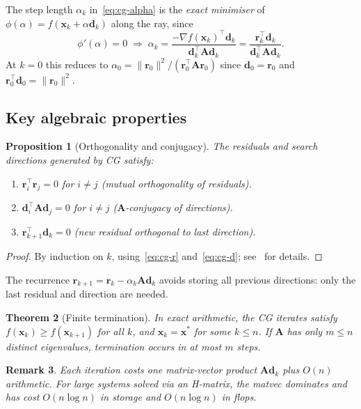 \documentclass[11pt,a4paper]{article}
\newtheorem{theorem}{Theorem}[section]
\newtheorem{proposition}[theorem]{Proposition}
\newtheorem{remark}[theorem]{Remark}
\newcommand{\bA}{\mathbf{A}}
\newcommand{\br}{\mathbf{r}}
\newcommand{\bd}{\mathbf{d}}
\newcommand{\bx}{\mathbf{x}}
\newcommand{\norm}[1]{\|#1\|}
\newcommand{\tr}{\top}
\begin{document}
The step length $\alpha_k$ in~\eqref{eq:cg-alpha} is the \emph{exact minimiser}
of $\phi(\alpha) = f(\bx_k + \alpha\bd_k)$ along the ray, since
\[
  \phi'(\alpha) = 0 \;\Longrightarrow\; \alpha_k
  = \frac{-\nabla f(\bx_k)^\tr \bd_k}{\bd_k^\tr \bA \bd_k}
  = \frac{\br_k^\tr \bd_k}{\bd_k^\tr \bA \bd_k}.
\]
At $k=0$ this reduces to $\alpha_0 = \norm{\br_0}^2 / (\br_0^\tr \bA \br_0)$
since $\bd_0 = \br_0$ and $\br_0^\tr\bd_0 = \norm{\br_0}^2$.

\subsection{Key algebraic properties}

\begin{proposition}[Orthogonality and conjugacy]
  \label{prop:orthogonality}
  The residuals and search directions generated by CG satisfy:
  \begin{enumerate}
    \item $\br_i^\tr \br_j = 0$ for $i \neq j$ (mutual orthogonality of residuals).
    \item $\bd_i^\tr \bA \bd_j = 0$ for $i \neq j$ ($\bA$-conjugacy of directions).
    \item $\br_{k+1}^\tr \bd_k = 0$ (new residual orthogonal to last direction).
  \end{enumerate}
\end{proposition}

\begin{proof}
  By induction on $k$, using~\eqref{eq:cg-r} and~\eqref{eq:cg-d}; see~\cite{NocWri2006} for details.
\end{proof}

The recurrence $\br_{k+1} = \br_k - \alpha_k\bA\bd_k$ avoids storing all previous directions:
only the last residual and direction are needed.

\begin{theorem}[Finite termination]
  \label{thm:finite}
  In exact arithmetic, the CG iterates satisfy $f(\bx_k) \geq f(\bx_{k+1})$ for all $k$,
  and $\bx_k = \bx^*$ for some $k \leq n$.
  If $\bA$ has only $m \leq n$ distinct eigenvalues, termination occurs in at most $m$ steps.
\end{theorem}

\begin{remark}
  Each iteration costs one matrix-vector product $\bA\bd_k$ plus $O(n)$ arithmetic.
  For large systems solved via an H-matrix, the matvec dominates and has cost
  $O(n \log n)$ in storage and $O(n \log n)$ in flops.
\end{remark}
\end{document}
